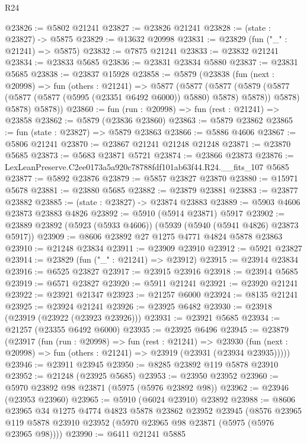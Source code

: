 \begin{lexlean}{R24}
\begin{coremodule}
@23826 := @5802 @21241
@23827 := @23826 @21241
@23828 := (state : @23827) -> @5875
@23829 := @13632 @20998
@23831 := @23829 (fun ("_" : @21241) => @5875)
@23832 := @7875 @21241
@23833 := @23832 @21241
@23834 := @23833 @5685
@23836 := @23831 @23834 @5880
@23837 := @23831 @5685
@23838 := @23837 @15928
@23858 := @5879
    (@23838
      (fun (next : @20998) =>
      fun (others : @21241) =>
      @5877
        (@5877
          (@5877
            (@5879 (@5877 (@5877 (@5877 (@5995 (@23351 @6492 @6000)) @5880) @5878) @5878))
            @5878)
          @5878)
        @5878))
@23860 := fun (run : @20998) => fun (rest : @21241) => @23858
@23862 := @5879 (@23836 @23860)
@23863 := @5879 @23862
@23865 := fun (state : @23827) => @5879 @23863
@23866 := @5886 @4606
@23867 := @5806 @21241
@23870 := @23867 @21241 @21248 @21248
@23871 := @23870 @5685
@23873 := @5683 @23871 @5721
@23874 := @23866 @23873
@23876 := LexLeanPreserve.C2ee0173a5a920c78788fdf101ab63f44.R24.__fits_107 @5685
@23877 := @5892 @23876
@23879 := @5857 @23827 @23870
@23880 := @15971 @5678
@23881 := @23880 @5685
@23882 := @23879 @23881
@23883 := @23877 @23882
@23885 := (state : @23827) -> @23874 @23883
@23889 := @5903 @4606 @23873 @23883 @4826
@23892 := @5910 (@5914 @23871) @5917
@23902 := @23889 @23892 (@5923 (@5933 @4606)) (@5939 (@5940 (@5941 @4826) @23873 @5917))
@23909 := @8606 @23892 @27 @1275 @4771 @4824 @5878 @23863
@23910 := @21248 @23834
@23911 := @23909 @23910
@23912 := @5921 @23827
@23914 := @23829 (fun ("_" : @21241) => @23912)
@23915 := @23914 @23834
@23916 := @6525 @23827
@23917 := @23915 @23916
@23918 := @23914 @5685
@23919 := @6571 @23827
@23920 := @5911 @21241
@23921 := @23920 @21241
@23922 := @23921 @21347
@23923 := @21257 @6000
@23924 := @8135 @21241
@23925 := @23924 @21241
@23926 := @23925 @6482
@23930 := @23918 (@23919 (@23922 (@23923 @23926)))
@23931 := @23921 @5685
@23934 := @21257 (@23355 @6492 @6000)
@23935 := @23925 @6496
@23945 := @23879
    (@23917
      (fun (run : @20998) =>
      fun (rest : @21241) =>
      @23930 (fun (next : @20998) => fun (others : @21241) => @23919 (@23931 (@23934 @23935)))))
@23946 := @23911 @23945
@23950 := @8285 @23892 @119 @5878 @23910
@23952 := @21248 (@23925 @5685)
@23953 := @23950 @23952
@23960 := @5970 @23892 @98 @23871 (@5975 (@5976 @23892 @98))
@23962 := @23946 (@23953 @23960)
@23965 := @5910 (@6024 @23910) @23892
@23988 := @8606
    @23965
    @34
    @1275
    @4774
    @4823
    @5878
    @23862
    @23952
    @23945
    (@8576 @23965 @119 @5878 @23910 @23952 (@5970 @23965 @98 @23871 (@5975 (@5976 @23965 @98))))
@23990 := @6411 @21241 @5885

\end{coremodule}
\end{lexlean}

